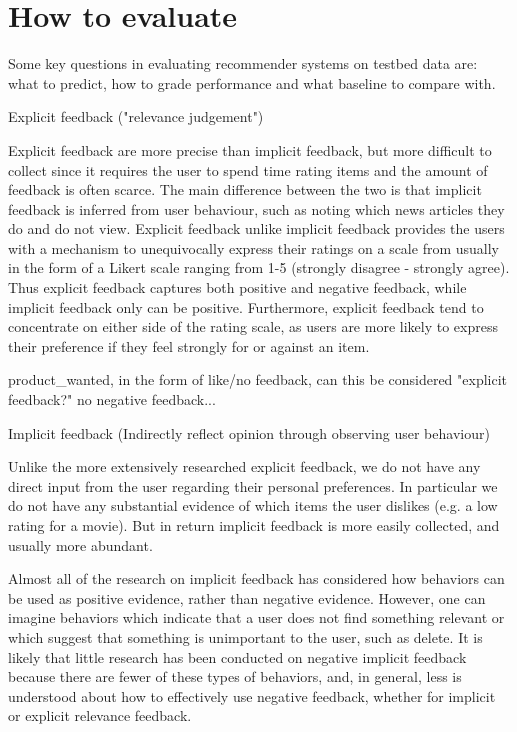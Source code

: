 
\section{How to evaluate}


Some key questions in evaluating recommender systems on testbed data are: what to predict, how to grade performance and what baseline to compare with.


Explicit feedback ("relevance judgement")

Explicit feedback are more precise than implicit feedback, but more difficult
to collect since it requires the user to spend time rating items and the amount
of feedback is often scarce. The main difference between the two is that
implicit feedback is inferred from user behaviour, such as noting which news
articles they do and do not view. Explicit feedback unlike implicit feedback
provides the users with a mechanism to unequivocally express their ratings on a
scale from usually in the form of a Likert scale ranging from 1-5 (strongly
disagree - strongly agree). Thus explicit feedback captures both positive and
negative feedback, while implicit feedback only can be positive. Furthermore,
explicit feedback tend to concentrate on either side of the rating scale, as
users are more likely to express their preference if they feel strongly for or
against an item.

product\_wanted, in the form of like/no feedback, can this be considered
"explicit feedback?" no negative feedback...

Implicit feedback (Indirectly reflect opinion through observing user behaviour)

Unlike the more extensively researched explicit feedback, we do not have any
direct input from the user regarding their personal preferences. In particular
we do not have any substantial evidence of which items the user dislikes (e.g. a
low rating for a movie). But in return implicit feedback is more easily
collected, and usually more abundant.

Almost all of the research on implicit feedback has considered how behaviors can
be used as positive evidence, rather than negative evidence. However, one can imagine
behaviors which indicate that a user does not find something relevant or which suggest
that something is unimportant to the user, such as delete. It is likely that little research
has been conducted on negative implicit feedback because there are fewer of these types
of behaviors, and, in general, less is understood about how to effectively use negative
feedback, whether for implicit or explicit relevance feedback.

